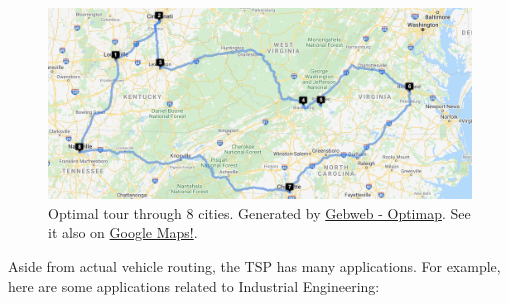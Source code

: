 \begin{figure}
\includegraphics[scale = 0.5]{optimization/figures/figures-static/tsp-optimal-route}
\caption{Optimal tour through 8 cities.  Generated by \href{https://www.gebweb.net/optimap/}{Gebweb - Optimap}.  See it also on \href{https://www.google.com/maps/dir/(38.2222341,+-85.75750389999999)/(39.0972041,+-84.52636389999999)/(38.0493956,+-84.4940986)/(37.1967465,+-80.4296817)/(37.2049884,+-79.9237747)/(37.5110489,+-77.40769019999999)/(35.2019605,+-80.81365720000001)/(36.1303318,+-86.78998039999999)/(38.2222341,+-85.75750389999999)/@36.8110947,-84.2113181,7.02z/data=!4m37!4m36!1m3!2m2!1d-85.7575039!2d38.2222341!1m3!2m2!1d-84.5263639!2d39.0972041!1m3!2m2!1d-84.4940986!2d38.0493956!1m3!2m2!1d-80.4296817!2d37.1967465!1m3!2m2!1d-79.9237747!2d37.2049884!1m3!2m2!1d-77.4076902!2d37.5110489!1m3!2m2!1d-80.8136572!2d35.2019605!1m3!2m2!1d-86.7899804!2d36.1303318!1m3!2m2!1d-85.7575039!2d38.2222341}{Google Maps!}.}
\end{figure}
Aside from actual vehicle routing, the TSP has many applications.  For example, here are some applications related to Industrial Engineering:

